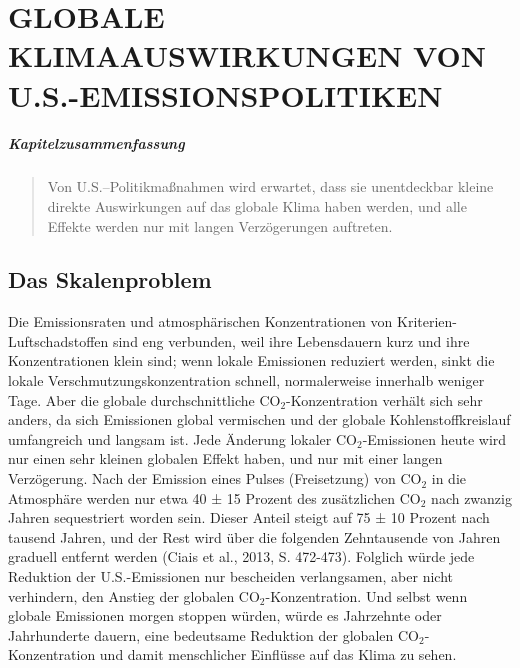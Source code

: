 \documentclass[12pt,paper=a4,DIV=12,parskip=never,chapterprefix=false,headings=standardclasses]{scrreprt}
\begin{document}
\endgroup

\cleardoublepage
\chapter{GLOBALE KLIMAAUSWIRKUNGEN VON U.S.-EMISSIONSPOLITIKEN}

\paragraph{Kapitelzusammenfassung}
\begin{quote}
Von U.S.--Politikmaßnahmen wird erwartet, dass sie unentdeckbar kleine direkte Auswirkungen auf das globale Klima haben werden, und alle Effekte werden nur mit langen Verzögerungen auftreten.
\end{quote}
\section{Das Skalenproblem}
Die Emissionsraten und atmosphärischen Konzentrationen von Kriterien-Luftschadstoffen sind eng verbunden, weil ihre Lebensdauern kurz und ihre Konzentrationen klein sind; wenn lokale Emissionen reduziert werden, sinkt die lokale Verschmutzungskonzentration schnell, normalerweise innerhalb weniger Tage. Aber die globale durchschnittliche CO$_2$-Konzentration verhält sich sehr anders, da sich Emissionen global vermischen und der globale Kohlenstoffkreislauf umfangreich und langsam ist. Jede Änderung lokaler CO$_2$-Emissionen heute wird nur einen sehr kleinen globalen Effekt haben, und nur mit einer langen Verzögerung.
Nach der Emission eines Pulses (Freisetzung) von CO$_2$ in die Atmosphäre werden nur etwa 40 ± 15 Prozent des zusätzlichen CO$_2$ nach zwanzig Jahren sequestriert worden sein. Dieser Anteil steigt auf 75 ± 10 Prozent nach tausend Jahren, und der Rest wird über die folgenden Zehntausende von Jahren graduell entfernt werden (Ciais et al., 2013, S. 472-473). Folglich würde jede Reduktion der U.S.-Emissionen nur bescheiden verlangsamen, aber nicht verhindern, den Anstieg der globalen CO$_2$-Konzentration. Und selbst wenn globale Emissionen morgen stoppen würden, würde es Jahrzehnte oder Jahrhunderte dauern, eine bedeutsame Reduktion der globalen CO$_2$-Konzentration und damit menschlicher Einflüsse auf das Klima zu sehen.
\end{document}
